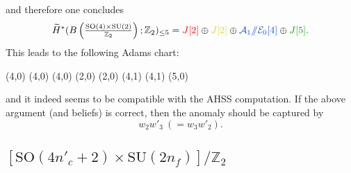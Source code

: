 \documentclass[12pt]{article}
\numberwithin{equation}{section}
\newcommand*{\colorA}[1]{\textcolor{colorA}{#1}}
\newcommand*{\colorB}[1]{\textcolor{colorB}{#1}}
\newcommand*{\colorC}[1]{\textcolor{colorC}{#1}}
\newcommand*{\colorD}[1]{\textcolor{colorD}{#1}}
\let\tilde\widetilde
\def\bZ{\mathbb{Z}}
\def\SU{\mathrm{SU}}
\def\SO{\mathrm{SO}}
\begin{document}
and therefore one concludes
\begin{equation}
	\tilde H^\ast(B\left(\tfrac{\SO(4)\times \SU(2)}{\bZ_2}\right);\bZ_2)_{\leq 5} = \colorA{J[2]} \oplus \colorC{J[2]} \oplus \colorB{\mathcal{A}_1/\!\!/\mathcal{E}_0[4]} \oplus \colorD{J[5]}.
\end{equation}
This leads to the following Adams chart:
\begin{center}
	\begin{sseqdata}[
		name=M,
		Adams grading,
		classes = fill,
		xrange = {0}{5},
		yrange = {0}{3},
	]
		\tower[colorB](4,0)
		\class[white](4,0)
		\class[white](4,0)
		\class[colorA](2,0)
		\class[colorC](2,0)
		\tower[colorA](4,1)
		\tower[colorC](4,1)
		\class[colorD](5,0)
	\end{sseqdata}
	\printpage[name = M,page = 2]
\end{center}
and it indeed seems to be compatible with the AHSS computation.
If the above argument (and beliefs) is correct, then the anomaly should be captured by
\begin{equation}
	w_2w'_3\ (= w_3w'_2).
\end{equation}

\subsection{$[\SO(4n'_c+2)\times \SU(2n_f)]/\bZ_2$}
\label{sec:so(2odd)}
\end{document}
